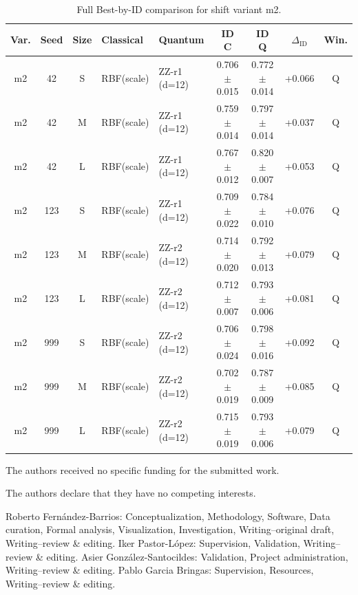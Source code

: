 \documentclass[pdflatex,sn-mathphys-num]{sn-jnl}%
\theoremstyle{thmstyleone}%
\theoremstyle{thmstyletwo}%
\theoremstyle{thmstylethree}%
\begin{document}
\begin{table}[t]
\centering
\caption{Full Best-by-ID comparison for shift variant m2.}
\label{tab:best_id_m2}
\scriptsize
\setlength{\tabcolsep}{3pt}
\begin{tabular}{@{}cccp{1.55cm}p{1.75cm}ccc c@{}}
\toprule
Var. & Seed & Size & Classical & Quantum & \shortstack{ID\\C} & \shortstack{ID\\Q} & $\Delta_{\mathrm{ID}}$ & Win. \\
\midrule
m2 & 42  & S & RBF(scale) & ZZ-r1 (d=12) & 0.706$\pm$0.015 & 0.772$\pm$0.014 & +0.066 & Q \\
m2 & 42  & M & RBF(scale) & ZZ-r1 (d=12) & 0.759$\pm$0.014 & 0.797$\pm$0.014 & +0.037 & Q \\
m2 & 42  & L & RBF(scale) & ZZ-r1 (d=12) & 0.767$\pm$0.012 & 0.820$\pm$0.007 & +0.053 & Q \\
m2 & 123 & S & RBF(scale) & ZZ-r1 (d=12) & 0.709$\pm$0.022 & 0.784$\pm$0.010 & +0.076 & Q \\
m2 & 123 & M & RBF(scale) & ZZ-r2 (d=12) & 0.714$\pm$0.020 & 0.792$\pm$0.013 & +0.079 & Q \\
m2 & 123 & L & RBF(scale) & ZZ-r2 (d=12) & 0.712$\pm$0.007 & 0.793$\pm$0.006 & +0.081 & Q \\
m2 & 999 & S & RBF(scale) & ZZ-r2 (d=12) & 0.706$\pm$0.024 & 0.798$\pm$0.016 & +0.092 & Q \\
m2 & 999 & M & RBF(scale) & ZZ-r2 (d=12) & 0.702$\pm$0.019 & 0.787$\pm$0.009 & +0.085 & Q \\
m2 & 999 & L & RBF(scale) & ZZ-r2 (d=12) & 0.715$\pm$0.019 & 0.793$\pm$0.006 & +0.079 & Q \\
\bottomrule
\end{tabular}
\end{table}

\clearpage
\backmatter
{}

The authors received no specific funding for the submitted work.

The authors declare that they have no competing interests.

Roberto Fernández-Barrios: Conceptualization, Methodology, Software, Data curation, Formal analysis, Visualization, Investigation, Writing--original draft, Writing--review \& editing.
Iker Pastor-López: Supervision, Validation, Writing--review \& editing.
Asier González-Santocildes: Validation, Project administration, Writing--review \& editing.
Pablo Garcia Bringas: Supervision, Resources, Writing--review \& editing.
\end{document}
